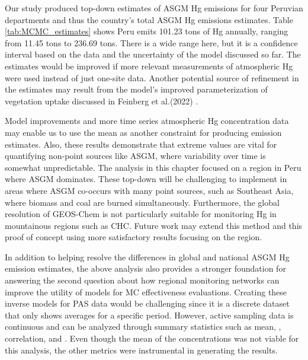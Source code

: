 \begin{flushleft}

 Our study produced top-down estimates of ASGM Hg emissions for four Peruvian departments and thus the country's total ASGM Hg emissions estimates. Table \ref{tab:MCMC_estimates} shows Peru emits 101.23 tons of Hg annually, ranging from 11.45 tons to 236.69 tons. There is a wide range here, but it is a confidence interval based on the data and the uncertainty of the model discussed so far. The estimates would be improved if more relevant measurements of atmospheric Hg were used instead of just one-site data. Another potential source of refinement in the estimates may result from the model's improved parameterization of vegetation uptake discussed in Feinberg et al.(2022) \cite{feinberg_evaluating_202}.
  \end{flushleft}
  
  \begin{flushleft}
  Model improvements and more time series atmospheric Hg concentration data may enable us to use the mean as another constraint for producing \hg emission estimates.  Also, these results demonstrate that extreme values are vital for quantifying non-point sources like ASGM, where variability over time is somewhat unpredictable. The analysis in this chapter focused on a region in Peru where ASGM dominates. These top-down will be challenging to implement in areas where ASGM co-occurs with many point sources, such as Southeast Asia, where biomass and coal are burned simultaneously. Furthermore, the global resolution of GEOS-Chem is not particularly suitable for monitoring Hg in mountainous regions such as CHC. Future work may extend this method and this proof of concept using more satisfactory results focusing on the region. 
   \end{flushleft}
  
  \begin{flushleft}
  In addition to helping resolve the differences in global and national ASGM Hg emission estimates, the above analysis also provides a stronger foundation for answering the second question about how regional monitoring networks can improve the utility of models for MC effectiveness evaluations. Creating these inverse models for PAS data would be challenging since it is a discrete dataset that only shows averages for a specific period. However, active sampling data is continuous and can be analyzed through summary statistics such as mean, \iq, correlation, and \nft. Even though the mean of the concentrations was not viable for this analysis, the other metrics were instrumental in generating the results.
\end{flushleft}



